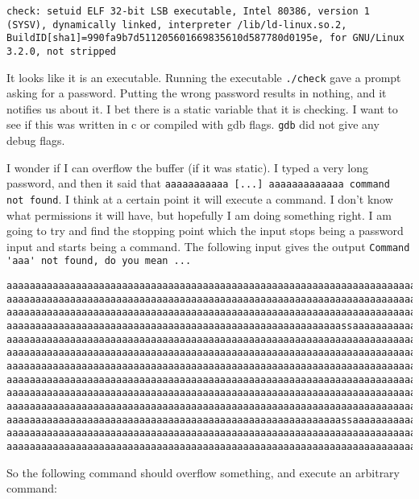 \documentclass[11pt]{article}
\begin{document}
\begin{lstlisting}
check: setuid ELF 32-bit LSB executable, Intel 80386, version 1 (SYSV), dynamically linked, interpreter /lib/ld-linux.so.2, BuildID[sha1]=990fa9b7d511205601669835610d587780d0195e, for GNU/Linux 3.2.0, not stripped
\end{lstlisting}

It looks like it is an executable. Running the executable \verb|./check| gave a prompt asking for a password. Putting the wrong password results in nothing, and it notifies us about it. I bet there is a static variable that it is checking. I want to see if this was written in c or compiled with gdb flags. \verb|gdb| did not give any debug flags.

I wonder if I can overflow the buffer (if it was static). I typed a very long password, and then it said that \verb|aaaaaaaaaaa [...] aaaaaaaaaaaaa command not found|. I think at a certain point it will execute a command. I don't know what permissions it will have, but hopefully I am doing something right. I am going to try and find the stopping point which the input stops being a password input and starts being a command. The following input gives the output \verb|Command 'aaa' not found, do you mean ...|

\begin{lstlisting}
aaaaaaaaaaaaaaaaaaaaaaaaaaaaaaaaaaaaaaaaaaaaaaaaaaaaaaaaaaaaaaaaaaaaaaaaaaaaaaa
aaaaaaaaaaaaaaaaaaaaaaaaaaaaaaaaaaaaaaaaaaaaaaaaaaaaaaaaaaaaaaaaaaaaaaaaaaaaaaa
aaaaaaaaaaaaaaaaaaaaaaaaaaaaaaaaaaaaaaaaaaaaaaaaaaaaaaaaaaaaaaaaaaaaaaaaaaaaaaa
aaaaaaaaaaaaaaaaaaaaaaaaaaaaaaaaaaaaaaaaaaaaaaaaaaaaaaaaaassaaaaaaaaaaaaaaaaaaa
aaaaaaaaaaaaaaaaaaaaaaaaaaaaaaaaaaaaaaaaaaaaaaaaaaaaaaaaaaaaaaaaaaaaaaaaaaaaaaa
aaaaaaaaaaaaaaaaaaaaaaaaaaaaaaaaaaaaaaaaaaaaaaaaaaaaaaaaaaaaaaaaaaaaaaaaaaaaaaa
aaaaaaaaaaaaaaaaaaaaaaaaaaaaaaaaaaaaaaaaaaaaaaaaaaaaaaaaaaaaaaaaaaaaaaaaaaaaaaa
aaaaaaaaaaaaaaaaaaaaaaaaaaaaaaaaaaaaaaaaaaaaaaaaaaaaaaaaaaaaaaaaaaaaaaaaaaaaaaa
aaaaaaaaaaaaaaaaaaaaaaaaaaaaaaaaaaaaaaaaaaaaaaaaaaaaaaaaaaaaaaaaaaaaaaaaaaaaaaa
aaaaaaaaaaaaaaaaaaaaaaaaaaaaaaaaaaaaaaaaaaaaaaaaaaaaaaaaaaaaaaaaaaaaaaaaaaaaaaa
aaaaaaaaaaaaaaaaaaaaaaaaaaaaaaaaaaaaaaaaaaaaaaaaaaaaaaaaaassaaaaaaaaaaaaaaaaaaa
aaaaaaaaaaaaaaaaaaaaaaaaaaaaaaaaaaaaaaaaaaaaaaaaaaaaaaaaaaaaaaaaaaaaaaaaaaaaaaa
aaaaaaaaaaaaaaaaaaaaaaaaaaaaaaaaaaaaaaaaaaaaaaaaaaaaaaaaaaaaaaaaaaaaaaaaaaaaaaa
\end{lstlisting}

So the following command should overflow something, and execute an arbitrary command:
\end{document}
